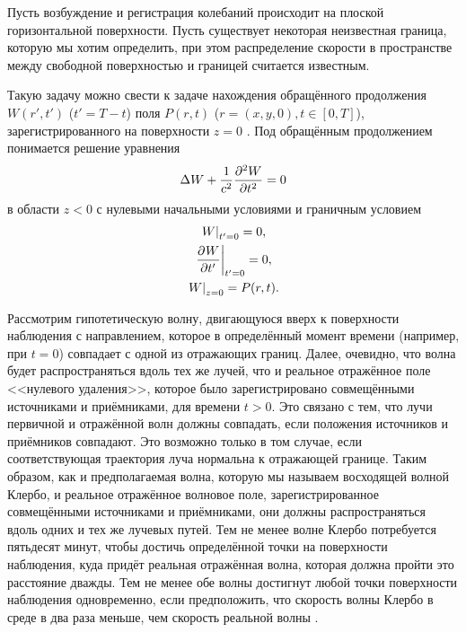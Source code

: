\documentclass[a4paper, fontsize=14pt]{article}
\begin{document}
	Пусть возбуждение и регистрация колебаний происходит на плоской горизонтальной поверхности. Пусть
	существует некоторая неизвестная граница, которую мы хотим определить, при этом распределение скорости в пространстве
	между свободной поверхностью и границей считается известным. 
	
	Такую задачу можно свести к задаче нахождения обращённого продолжения $W(r',t')$ ($t' = T-t$) поля $P(r,t)$ ($r=(x,y,0),t\in[0,T]$), зарегистрированного на поверхности $z=0$ \cite{petrashen}. 
	Под обращённым продолжением понимается решение уравнения
	\begin{equation}
		\Delta W + \frac{1}{c^2} \diff[2]{W}{t} = 0
	\end{equation}
	в области $z<0$ с нулевыми начальными условиями и граничным условием
	\begin{gather*}
		\left.W\right|_{t'=0} = 0, \\
		\left.\diff{W}{t'}\right|_{t'=0} = 0, \\
		 \left.W\right|_{z=0} = P(r,t).
	\end{gather*}
	
	Рассмотрим гипотетическую волну, двигающуюся вверх к поверхности наблюдения с направлением, которое в определённый момент времени (например, при $t = 0$) совпадает с одной из отражающих границ. Далее, очевидно, что волна будет распространяться вдоль тех же лучей, что и реальное отражённое поле <<нулевого удаления>>, которое было зарегистрировано совмещёнными источниками и приёмниками, для времени $t>0$. Это связано с тем, что лучи первичной и отражённой волн должны совпадать, если положения источников и приёмников совпадают. Это возможно только в том случае, если соответствующая траектория луча нормальна к отражающей границе. Таким образом, как и предполагаемая волна, которую мы называем восходящей волной Клербо, и реальное отражённое волновое поле, зарегистрированное совмещёнными источниками и приёмниками, они должны распространяться вдоль одних и тех же лучевых путей. Тем не менее волне Клербо потребуется пятьдесят минут, чтобы достичь определённой точки на поверхности наблюдения, куда придёт реальная отражённая волна, которая должна пройти это расстояние дважды. Тем не менее обе волны достигнут любой точки поверхности наблюдения одновременно, если предположить, что скорость волны Клербо в среде в два раза меньше, чем скорость реальной волны \cite{zhdanov2007}.
\end{document}
